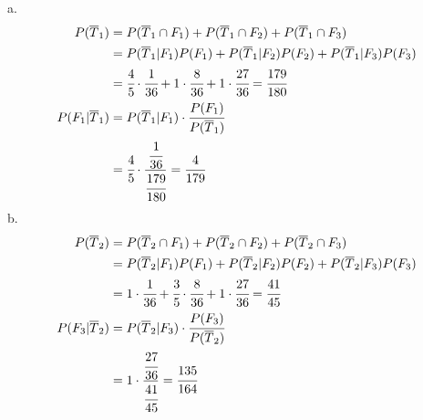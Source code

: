 \documentclass[11pt]{article}
\begin{document}
a. 
\begin{equation*}
\begin{aligned}
P(\overline{T}_1) &= P(\overline{T}_1 \cap F_1) + P(\overline{T}_1 \cap F_2)  +P(\overline{T}_1 \cap F_3) \\
&= P(\overline{T}_1 | F_1)P(F_1) + P(\overline{T}_1 | F_2)P(F_2)  +P(\overline{T}_1 | F_3)P(F_3) \\
&= \cfrac{4}{5} \cdot \cfrac{1}{36} + 1 \cdot \cfrac{8}{36} + 1 \cdot  \cfrac{27}{36} = \cfrac{179}{180}\\
P(F_1|\overline{T}_1) &= P(\overline{T}_1 | F_1) \cdot \cfrac{P(F_1)}{P(\overline{T}_1)} \\
&= \cfrac{4}{5} \cdot \frac{\cfrac{1}{36}}{\cfrac{179}{180}} = \cfrac{4}{179} 
\end{aligned}
\end{equation*}
b.
\begin{equation*}
\begin{aligned}
P(\overline{T}_2) &= P(\overline{T}_2 \cap F_1) + P(\overline{T}_2 \cap F_2)  +P(\overline{T}_2 \cap F_3) \\
&= P(\overline{T}_2 | F_1)P(F_1) + P(\overline{T}_2 | F_2)P(F_2)  +P(\overline{T}_2 | F_3)P(F_3) \\
&= 1 \cdot \cfrac{1}{36} + \cfrac{3}{5}  \cdot \cfrac{8}{36} + 1 \cdot  \cfrac{27}{36} = \cfrac{41}{45}\\
P(F_3|\overline{T}_2) &= P(\overline{T}_2 | F_3) \cdot \cfrac{P(F_3)}{P(\overline{T}_2)} \\
&= 1 \cdot \frac{\cfrac{27}{36}}{\cfrac{41}{45}} = \cfrac{135}{164} 
\end{aligned}
\end{equation*} 
\pagebreak
\end{document}
